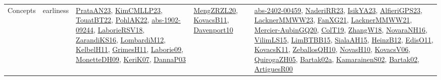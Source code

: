 {\begin{longtable}{lp{3cm}>{\raggedright}p{6cm}>{\raggedright}p{6cm}p{8cm}}
Concepts & earliness & \href{articles/PrataAN23.pdf}{PrataAN23}\cite{PrataAN23}, \href{papers/KimCMLLP23.pdf}{KimCMLLP23}\cite{KimCMLLP23}, \href{papers/TouatBT22.pdf}{TouatBT22}\cite{TouatBT22}, \href{articles/PohlAK22.pdf}{PohlAK22}\cite{PohlAK22}, \href{articles/abs-1902-09244.pdf}{abs-1902-09244}\cite{abs-1902-09244}, \href{articles/LaborieRSV18.pdf}{LaborieRSV18}\cite{LaborieRSV18}, \href{articles/ZarandiKS16.pdf}{ZarandiKS16}\cite{ZarandiKS16}, \href{articles/LombardiM12.pdf}{LombardiM12}\cite{LombardiM12}, \href{articles/KelbelH11.pdf}{KelbelH11}\cite{KelbelH11}, \href{papers/GrimesH11.pdf}{GrimesH11}\cite{GrimesH11}, \href{papers/Laborie09.pdf}{Laborie09}\cite{Laborie09}, \href{papers/MonetteDH09.pdf}{MonetteDH09}\cite{MonetteDH09}, \href{papers/KeriK07.pdf}{KeriK07}\cite{KeriK07}, \href{papers/DannaP03.pdf}{DannaP03}\cite{DannaP03} & \href{articles/MengZRZL20.pdf}{MengZRZL20}\cite{MengZRZL20}, \href{articles/KovacsB11.pdf}{KovacsB11}\cite{KovacsB11}, \href{papers/Davenport10.pdf}{Davenport10}\cite{Davenport10} & \href{articles/abs-2402-00459.pdf}{abs-2402-00459}\cite{abs-2402-00459}, \href{articles/NaderiRR23.pdf}{NaderiRR23}\cite{NaderiRR23}, \href{articles/IsikYA23.pdf}{IsikYA23}\cite{IsikYA23}, \href{articles/AlfieriGPS23.pdf}{AlfieriGPS23}\cite{AlfieriGPS23}, \href{articles/LacknerMMWW23.pdf}{LacknerMMWW23}\cite{LacknerMMWW23}, \href{articles/FanXG21.pdf}{FanXG21}\cite{FanXG21}, \href{papers/LacknerMMWW21.pdf}{LacknerMMWW21}\cite{LacknerMMWW21}, \href{papers/Mercier-AubinGQ20.pdf}{Mercier-AubinGQ20}\cite{Mercier-AubinGQ20}, \href{papers/ColT19.pdf}{ColT19}\cite{ColT19}, \href{articles/ZhangW18.pdf}{ZhangW18}\cite{ZhangW18}, \href{articles/NovaraNH16.pdf}{NovaraNH16}\cite{NovaraNH16}, \href{papers/VilimLS15.pdf}{VilimLS15}\cite{VilimLS15}, \href{papers/LimBTBB15.pdf}{LimBTBB15}\cite{LimBTBB15}, \href{papers/SialaAH15.pdf}{SialaAH15}\cite{SialaAH15}, \href{papers/HeinzB12.pdf}{HeinzB12}\cite{HeinzB12}, \href{papers/EdisO11.pdf}{EdisO11}\cite{EdisO11}, \href{articles/KovacsK11.pdf}{KovacsK11}\cite{KovacsK11}, \href{articles/ZeballosQH10.pdf}{ZeballosQH10}\cite{ZeballosQH10}, \href{articles/NovasH10.pdf}{NovasH10}\cite{NovasH10}, \href{papers/KovacsV06.pdf}{KovacsV06}\cite{KovacsV06}, \href{papers/QuirogaZH05.pdf}{QuirogaZH05}\cite{QuirogaZH05}, \href{papers/Bartak02a.pdf}{Bartak02a}\cite{Bartak02a}, \href{papers/KamarainenS02.pdf}{KamarainenS02}\cite{KamarainenS02}, \href{papers/Bartak02.pdf}{Bartak02}\cite{Bartak02}, \href{articles/ArtiguesR00.pdf}{ArtiguesR00}\cite{ArtiguesR00}\\

\end{longtable}}
